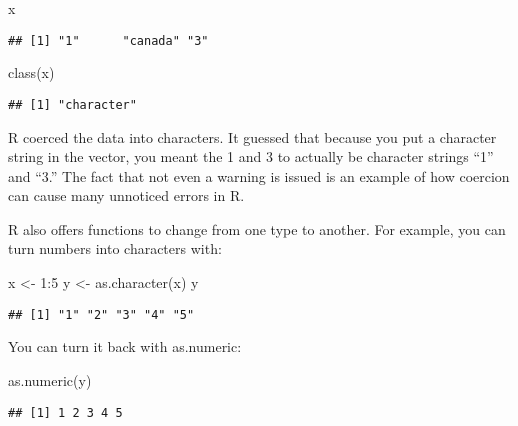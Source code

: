 \documentclass[
]{article}
\newenvironment{Shaded}{\begin{snugshade}}{\end{snugshade}}
\newcommand{\DecValTok}[1]{\textcolor[rgb]{0.00,0.00,0.81}{#1}}
\newcommand{\FunctionTok}[1]{\textcolor[rgb]{0.00,0.00,0.00}{#1}}
\newcommand{\NormalTok}[1]{#1}
\newcommand{\OtherTok}[1]{\textcolor[rgb]{0.56,0.35,0.01}{#1}}
\newcommand{\SpecialCharTok}[1]{\textcolor[rgb]{0.00,0.00,0.00}{#1}}
\begin{document}
\begin{Shaded}
\begin{Highlighting}[]
\NormalTok{x}
\end{Highlighting}
\end{Shaded}

\begin{verbatim}
## [1] "1"      "canada" "3"
\end{verbatim}

\begin{Shaded}
\begin{Highlighting}[]
\FunctionTok{class}\NormalTok{(x)}
\end{Highlighting}
\end{Shaded}

\begin{verbatim}
## [1] "character"
\end{verbatim}

R coerced the data into characters. It guessed that because you put a
character string in the vector, you meant the 1 and 3 to actually be
character strings ``1'' and ``3.'' The fact that not even a warning is
issued is an example of how coercion can cause many unnoticed errors in
R.

R also offers functions to change from one type to another. For example,
you can turn numbers into characters with:

\begin{Shaded}
\begin{Highlighting}[]
\NormalTok{x }\OtherTok{\textless{}{-}} \DecValTok{1}\SpecialCharTok{:}\DecValTok{5}
\NormalTok{y }\OtherTok{\textless{}{-}} \FunctionTok{as.character}\NormalTok{(x)}
\NormalTok{y}
\end{Highlighting}
\end{Shaded}

\begin{verbatim}
## [1] "1" "2" "3" "4" "5"
\end{verbatim}

You can turn it back with as.numeric:

\begin{Shaded}
\begin{Highlighting}[]
\FunctionTok{as.numeric}\NormalTok{(y)}
\end{Highlighting}
\end{Shaded}

\begin{verbatim}
## [1] 1 2 3 4 5
\end{verbatim}
\end{document}
